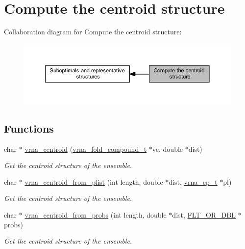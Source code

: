 \hypertarget{group__centroid__fold}{}\section{Compute the centroid structure}
\label{group__centroid__fold}
Collaboration diagram for Compute the centroid structure\+:
\nopagebreak
\begin{figure}[H]
\begin{center}
\leavevmode
\includegraphics[width=350pt]{group__centroid__fold}
\end{center}
\end{figure}
\subsection*{Functions}
\begin{DoxyCompactItemize}
\item 
char $\ast$ \hyperlink{group__centroid__fold_ga0e64bb67e51963dc71cbd4d30b80a018}{vrna\+\_\+centroid} (\hyperlink{group__fold__compound_ga1b0cef17fd40466cef5968eaeeff6166}{vrna\+\_\+fold\+\_\+compound\+\_\+t} $\ast$vc, double $\ast$dist)
\begin{DoxyCompactList}\small\item\em Get the centroid structure of the ensemble. \end{DoxyCompactList}\item 
char $\ast$ \hyperlink{group__centroid__fold_ga13881673a0b214d42a59140ef5764dbb}{vrna\+\_\+centroid\+\_\+from\+\_\+plist} (int length, double $\ast$dist, \hyperlink{group__struct__utils_gab9ac98ab55ded9fb90043b024b915aca}{vrna\+\_\+ep\+\_\+t} $\ast$pl)
\begin{DoxyCompactList}\small\item\em Get the centroid structure of the ensemble. \end{DoxyCompactList}\item 
char $\ast$ \hyperlink{group__centroid__fold_ga98193ede06778a9ea966cc8fc43d0804}{vrna\+\_\+centroid\+\_\+from\+\_\+probs} (int length, double $\ast$dist, \hyperlink{group__data__structures_ga31125aeace516926bf7f251f759b6126}{F\+L\+T\+\_\+\+O\+R\+\_\+\+D\+BL} $\ast$probs)
\begin{DoxyCompactList}\small\item\em Get the centroid structure of the ensemble. \end{DoxyCompactList}\end{DoxyCompactItemize}


